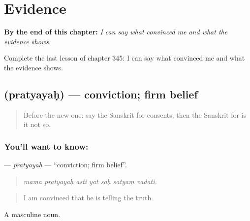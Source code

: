 
\chapter{Evidence}
\label{ch:sa-evidence}

\begin{chapteropening}
\textbf{By the end of this chapter:} \emph{I can say what convinced me and what the evidence shows.}

Complete the last lesson of chapter 345: I can say what convinced me and what the evidence shows.
\end{chapteropening}

\section[\texorpdfstring{\sk{प्रत्ययः} (pratyayaḥ)}{प्रत्ययः (pratyayaḥ)}]{ (pratyayaḥ) — conviction; firm belief}

\label{lesson:SA-C345-pratyayah}



\begin{quote}
Before the new one: say the Sanskrit for consents, then the Sanskrit for is it not so.
\end{quote}

\subsection*{You'll want to know: }
\textbf{} — \emph{pratyayaḥ} — \textquotedblleft{}conviction; firm belief\textquotedblright{}.

\begin{quote}
      
\end{quote}

\begin{quote}
\emph{mama pratyayaḥ asti yat saḥ satyaṃ vadati.}
\end{quote}

\begin{quote}
I am convinced that he is telling the truth.
\end{quote}

A masculine noun.

